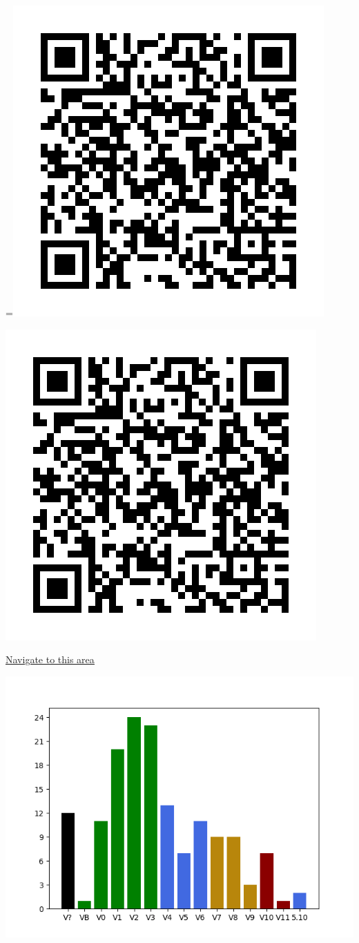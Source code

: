 \raggedcolumns
\begin{multicols}{2}
=\hbox{\includegraphics[width=0.45\linewidth]{./maps/qr//The Garden Main_qr.png}}%
\begin{center}
\includegraphics[width=0.45\linewidth]{./maps/qr//The Garden Main_qr.png}
\end{center}
\begin{center}
\underline{\textcolor{blue}{\href{http://maps.google.com/maps?q=44.44076010641458,-122.5752659013521}{Navigate to this area}}}
\end{center}


\includegraphics[width=\linewidth]{./maps/plots//The Garden Main.png}
\end{multicols}
